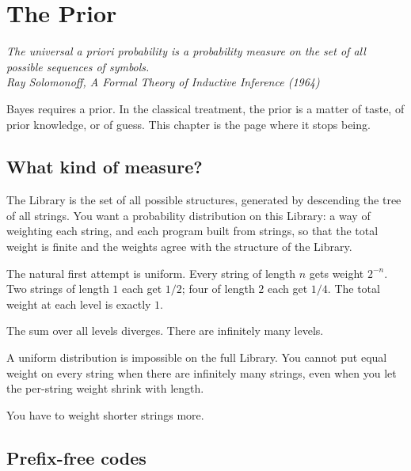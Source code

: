 \chapter{The Prior}

\vspace{1em}
\hfill
\begin{minipage}[c]{0.55\textwidth}
\raggedleft
\small\itshape
The universal a priori probability is a probability measure on the set of all possible sequences of symbols.\\[0.5em]
\upshape\footnotesize Ray Solomonoff, \textit{A Formal Theory of Inductive Inference} (1964)
\end{minipage}%
\hspace{0.5em}
\begin{minipage}[c]{0.12\textwidth}
\end{minipage}
\vspace{1.5em}

\noindent Bayes requires a prior. In the classical treatment, the prior is a matter of taste, of prior knowledge, or of guess. This chapter is the page where it stops being.

\section*{What kind of measure?}

The Library is the set of all possible structures, generated by descending the tree of all strings. You want a probability distribution on this Library: a way of weighting each string, and each program built from strings, so that the total weight is finite and the weights agree with the structure of the Library.

The natural first attempt is uniform. Every string of length $n$ gets weight $2^{-n}$. Two strings of length $1$ each get $1/2$; four of length $2$ each get $1/4$. The total weight at each level is exactly $1$.

The sum over all levels diverges. There are infinitely many levels.

A uniform distribution is impossible on the full Library. You cannot put equal weight on every string when there are infinitely many strings, even when you let the per-string weight shrink with length.

You have to weight shorter strings more.

\section*{Prefix-free codes}

